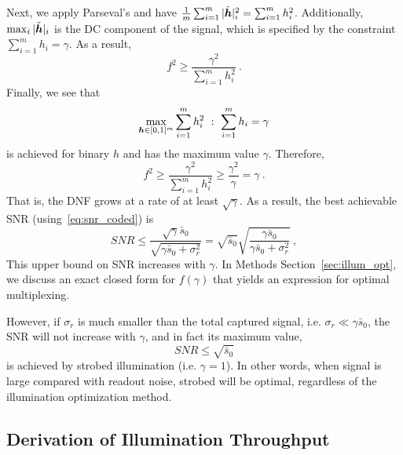 Next, we apply Parseval's and have $\frac{1}{m}\sum_{i=1}^m |\tilde {\bm{h}}|_i^2 = \sum_{i=1}^m h_i^2$.
Additionally, $\max_i |\tilde {\bm{h}}|_i$ is the DC component of the signal, which is specified by the constraint $\sum_{i=1}^m h_i = \gamma$.
As a result, $$ f^2 \geq \frac{\gamma^2}{\sum_{i=1}^m h_i^2}\:.$$
Finally, we see that
$$\max_{\bm{h}\in[0,1]^m} \sum_{i=1}^m h_i^2~:~ \sum_{i=1}^m h_i=\gamma$$
is achieved for binary $h$ and has the maximum value $\gamma$. Therefore, 
\[f^2 \geq \frac{\gamma^2}{\sum_{i=1}^m h_i^2} \geq \frac{\gamma^2}{\gamma} = \gamma\:.\]
That is, the DNF grows at a rate of at least $\sqrt{\gamma}$. As a result,  the best achievable SNR (using~\eqref{eq:snr_coded}) is
$$ SNR  \leq \frac{\sqrt{\gamma}\bar{s}_0}{\sqrt{\gamma\bar{s}_0 + \sigma^2_{r}}}
=\sqrt{\bar{s}_0}\sqrt{\frac{\gamma \bar{s}_0 }{\gamma\bar{s}_0 + \sigma^2_{r}}}\:,
$$
This upper bound on SNR increases with ${\gamma}$.
In Methods Section~\ref{sec:illum_opt}, we discuss an exact closed form for $f(\gamma)$ that yields an expression for optimal multiplexing.

However, if $\sigma_r$ is much smaller than the total captured signal, i.e. $\sigma_r \ll \gamma \bar{s}_0 $, the SNR will not increase with $\gamma$, and in fact its maximum value,
$$SNR \leq \sqrt{\bar{s}_0}$$
is achieved by strobed illumination (i.e. $\gamma=1$). In other words, when signal is large compared with readout noise, strobed will be optimal, regardless of the illumination optimization method.


\subsection{Derivation of Illumination Throughput}\label{sec:app_throughput}

